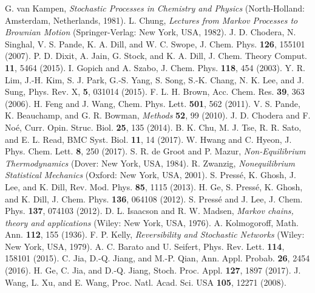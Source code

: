 \documentclass[aps,pre,amsmath,amssymb,floatfix,preprint,nofootinbib]{revtex4}
\begin{document}
\begin{thebibliography}{}
 G. van Kampen,  {\it Stochastic Processes in Chemistry and Physics} (North-Holland: Amsterdam, Netherlands, 1981).
 L. Chung, {\it Lectures from Markov Processes to Brownian Motion} (Springer-Verlag: New York, USA, 1982).
J. D. Chodera,  N. Singhal, V. S. Pande, K. A. Dill, and W. C. Swope, J. Chem. Phys. \textbf{126}, 155101 (2007).
P. D. Dixit, A. Jain, G. Stock, and K. A. Dill, J. Chem. Theory Comput.  \textbf{11}, 5464 (2015).
  I. Gopich and A. Szabo,  J. Chem. Phys.   \textbf{118}, 454 (2003).
  Y. R. Lim, J.-H. Kim,  S. J. Park,  G.-S. Yang, S. Song, S.-K. Chang, N. K. Lee, and J. Sung, Phys. Rev. X, \textbf{5}, 031014 (2015). 
F. L. H. Brown, Acc. Chem. Res. \textbf{39}, 363 (2006).
 H. Feng and J. Wang,  Chem. Phys. Lett.  \textbf{501}, 562 (2011).
 V. S. Pande, K. Beauchamp, and G. R. Bowman, {\it Methods} \textbf{52}, 99 (2010).
J. D. Chodera and F. No\'e, Curr. Opin. Struc. Biol. \textbf{25}, 135 (2014).
B. K. Chu,  M. J. Tse, R. R. Sato, and  E. L. Read, BMC Syst. Biol. \textbf{11}, 14 (2017).
 W. Hwang and C. Hyeon,  J. Phys. Chem. Lett. \textbf{8}, 250 (2017). 
 S. R. de Groot and P. Mazur,   {\it Non-Equilibrium Thermodynamics} (Dover: New York, USA, 1984).
 R. Zwanzig,  {\it Nonequilibrium Statistical Mechanics} (Oxford: New York, USA, 2001).
S. Press\'e, K. Ghosh, J. Lee, and K. Dill,  Rev. Mod. Phys. \textbf{85}, 1115 (2013). 
H. Ge,  S. Press\'e, K. Ghosh, and K. Dill, J. Chem. Phys. \textbf{136}, 064108 (2012). 
 S. Press\'e and J. Lee, J. Chem. Phys. \textbf{137}, 074103 (2012).
  D. L. Isaacson and R. W. Madsen,  {\it Markov chains, theory and applications} (Wiley: New York, USA, 1976).
  A. Kolmogoroff, Math. Ann. \textbf{112}, 155 (1936).
 F. P. Kelly,  {\it Reversibility and Stochastic Networks} (Wiley: New York, USA, 1979).
 A. C. Barato and U. Seifert, Phys. Rev. Lett. \textbf{114}, 158101 (2015).
 C. Jia, D.-Q. Jiang, and M.-P. Qian, Ann. Appl. Probab. \textbf{26}, 2454 (2016).
 H. Ge,  C. Jia, and D.-Q. Jiang, Stoch. Proc.  Appl. \textbf{127}, 1897 (2017).
 J. Wang, L. Xu, and E. Wang, Proc. Natl. Acad. Sci. USA \textbf{105}, 12271 (2008). 

\end{thebibliography}
\end{document}
